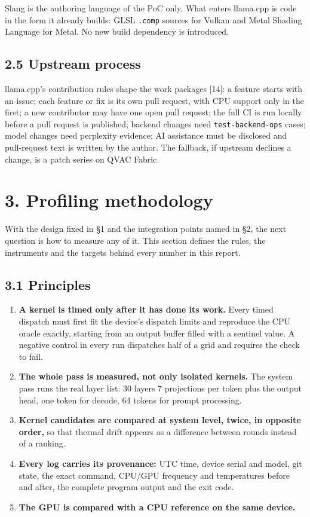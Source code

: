 \documentclass[
  10pt,
]{article}
\providecommand{\tightlist}{%
  \setlength{\itemsep}{0pt}\setlength{\parskip}{0pt}}
\begin{document}
Slang is the authoring language of the PoC only. What enters llama.cpp
is code in the form it already builds: GLSL \texttt{.comp} sources for
Vulkan and Metal Shading Language for Metal. No new build dependency is
introduced.

\subsection{2.5 Upstream process}\label{upstream-process}

llama.cpp's contribution rules shape the work packages [14]: a
feature starts with an issue; each feature or fix is its own pull
request, with CPU support only in the first; a new contributor may have
one open pull request; the full CI is run locally before a pull request
is published; backend changes need \texttt{test-backend-ops} cases;
model changes need perplexity evidence; AI assistance must be disclosed
and pull-request text is written by the author. The fallback, if
upstream declines a change, is a patch series on QVAC Fabric.

\section{3. Profiling methodology}\label{profiling-methodology}

With the design fixed in \S{}1 and the integration points named in
\S{}2, the next question is how to measure any of it. This section
defines the rules, the instruments and the targets behind every number
in this report.

\subsection{3.1 Principles}\label{principles}

\begin{enumerate}
\def\labelenumi{\arabic{enumi}.}
\tightlist%
\item
  \textbf{A kernel is timed only after it has done its work.} Every
  timed dispatch must first fit the device's dispatch limits and
  reproduce the CPU oracle exactly, starting from an output buffer
  filled with a sentinel value. A negative control in every run
  dispatches half of a grid and requires the check to fail.
\item
  \textbf{The whole pass is measured, not only isolated kernels.} The
  system pass runs the real layer list: 30 layers \texttimes{} 7 projections per
  token plus the output head, one token for decode, 64 tokens for prompt
  processing.
\item
  \textbf{Kernel candidates are compared at system level, twice, in
  opposite order,} so that thermal drift appears as a difference between
  rounds instead of a ranking.
\item
  \textbf{Every log carries its provenance:} UTC time, device serial and
  model, git state, the exact command, CPU/GPU frequency and
  temperatures before and after, the complete program output and the
  exit code.
\item
  \textbf{The GPU is compared with a CPU reference on the same device.}
\end{enumerate}
\end{document}
